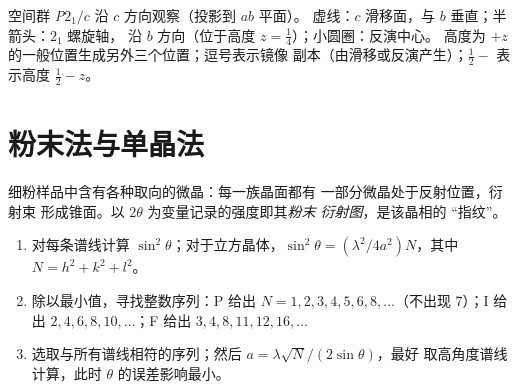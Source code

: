 \begin{omfigure}

{\small 空间群 \textit{P}$2_1/c$ 沿 $c$ 方向观察（投影到 $ab$ 平面）。
虚线：$c$ 滑移面，与 $b$ 垂直；半箭头：$2_1$ 螺旋轴，
沿 $b$ 方向（位于高度 $z = \frac14$）；小圆圈：反演中心。
高度为 $+z$ 的一般位置生成另外三个位置；逗号表示镜像
副本（由滑移或反演产生）；$\frac12{-}$ 表示高度 $\frac12 - z$。}
\end{omfigure}

\section{粉末法与单晶法}

\begin{definition}[粉末衍射图]\label{def:b3:x-ray-diffraction:powder}
细粉样品中含有各种取向的微晶：每一族晶面都有
一部分微晶处于反射位置，衍射束
形成锥面。以 $2\theta$ 为变量记录的强度即其\emph{粉末
衍射图}，是该晶相的
“指纹”。
\end{definition}

\begin{method}[立方晶系粉末图的指标化]\label{met:b3:x-ray-diffraction:index-cubic}
\begin{enumerate}
  \item 对每条谱线计算 $\sin^2\theta$；对于立方晶体，$\sin^2\theta =
        (\lambda^2/4a^2)N$，其中 $N = h^2 + k^2 + l^2$。
  \item 除以最小值，寻找整数序列：P 给出
        $N = 1, 2, 3, 4, 5, 6, 8, \dots$（不出现 7）；I 给出 $2, 4, 6, 8, 10, \dots$；F 给出
        $3, 4, 8, 11, 12, 16, \dots$
  \item 选取与所有谱线相符的序列；然后 $a = \lambda\sqrt N/(2\sin\theta)$，最好
        取高角度谱线计算，此时 $\theta$ 的误差影响最小。
\end{enumerate}
\end{method}

